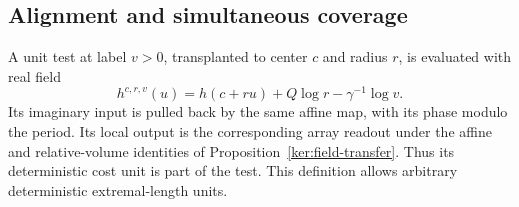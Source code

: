 \subsection{Alignment and simultaneous coverage}

A unit test at label \(v>0\), transplanted to center \(c\) and
radius \(r\), is evaluated with real field
\begin{equation}
 h^{c,r,v}(u)=h(c+ru)+Q\log r-\gamma^{-1}\log v.
 \label{ann:normalized-field}
\end{equation}
Its imaginary input is pulled back by the same affine map, with its
phase modulo the period.  Its local output is the corresponding
array readout under the affine and relative-volume identities of
Proposition~\ref{ker:field-transfer}.  Thus its deterministic cost
unit is part of the test.  This definition allows arbitrary
deterministic extremal-length units.

